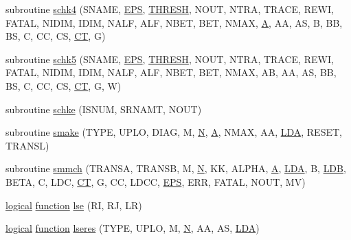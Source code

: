 \begin{DoxyCompactItemize}
\item 
subroutine \hyperlink{sblat3_8f_a57343063350f870a00e61c74d426e7d9}{schk4} (S\+N\+A\+M\+E, \hyperlink{tukey_8c_a6ebf6899d6c1c8b7b9d09be872c05aae}{E\+P\+S}, \hyperlink{zlaqgs_8c_a0656018abfc9fa2821827415f5d5ea57}{T\+H\+R\+E\+S\+H}, N\+O\+U\+T, N\+T\+R\+A, T\+R\+A\+C\+E, R\+E\+W\+I, F\+A\+T\+A\+L, N\+I\+D\+I\+M, I\+D\+I\+M, N\+A\+L\+F, A\+L\+F, N\+B\+E\+T, B\+E\+T, N\+M\+A\+X, \hyperlink{classA}{A}, A\+A, A\+S, B, B\+B, B\+S, C, C\+C, C\+S, \hyperlink{tau_8h_ae9ab3801c1afb4f20cfd669d76aec283}{C\+T}, G)
\item 
subroutine \hyperlink{sblat3_8f_a811bf0c7768bfc6cbd7ebe565f6f42a1}{schk5} (S\+N\+A\+M\+E, \hyperlink{tukey_8c_a6ebf6899d6c1c8b7b9d09be872c05aae}{E\+P\+S}, \hyperlink{zlaqgs_8c_a0656018abfc9fa2821827415f5d5ea57}{T\+H\+R\+E\+S\+H}, N\+O\+U\+T, N\+T\+R\+A, T\+R\+A\+C\+E, R\+E\+W\+I, F\+A\+T\+A\+L, N\+I\+D\+I\+M, I\+D\+I\+M, N\+A\+L\+F, A\+L\+F, N\+B\+E\+T, B\+E\+T, N\+M\+A\+X, A\+B, A\+A, A\+S, B\+B, B\+S, C, C\+C, C\+S, \hyperlink{tau_8h_ae9ab3801c1afb4f20cfd669d76aec283}{C\+T}, G, W)
\item 
subroutine \hyperlink{sblat3_8f_a1e23a9d74d4acf6f0a0c0944d653b213}{schke} (I\+S\+N\+U\+M, S\+R\+N\+A\+M\+T, N\+O\+U\+T)
\item 
subroutine \hyperlink{sblat3_8f_af6989f98e6d5db4084fdbf5b2a153d3d}{smake} (T\+Y\+P\+E, U\+P\+L\+O, D\+I\+A\+G, M, \hyperlink{polmisc_8c_a0240ac851181b84ac374872dc5434ee4}{N}, \hyperlink{classA}{A}, N\+M\+A\+X, A\+A, \hyperlink{example__user_8c_ae946da542ce0db94dced19b2ecefd1aa}{L\+D\+A}, R\+E\+S\+E\+T, T\+R\+A\+N\+S\+L)
\item 
subroutine \hyperlink{sblat3_8f_a8b530541d1d90ba10621058fbabcf4e4}{smmch} (T\+R\+A\+N\+S\+A, T\+R\+A\+N\+S\+B, M, \hyperlink{polmisc_8c_a0240ac851181b84ac374872dc5434ee4}{N}, K\+K, A\+L\+P\+H\+A, \hyperlink{classA}{A}, \hyperlink{example__user_8c_ae946da542ce0db94dced19b2ecefd1aa}{L\+D\+A}, B, \hyperlink{example__user_8c_a50e90a7104df172b5a89a06c47fcca04}{L\+D\+B}, B\+E\+T\+A, C, L\+D\+C, \hyperlink{tau_8h_ae9ab3801c1afb4f20cfd669d76aec283}{C\+T}, G, C\+C, L\+D\+C\+C, \hyperlink{tukey_8c_a6ebf6899d6c1c8b7b9d09be872c05aae}{E\+P\+S}, E\+R\+R, F\+A\+T\+A\+L, N\+O\+U\+T, M\+V)
\item 
\hyperlink{tnc_8c_aa7b64cdf39500931f7b333343791a104}{logical} \hyperlink{afunc_8m_a7b5e596df91eadea6c537c0825e894a7}{function} \hyperlink{sblat3_8f_a1c298334ebbca6a82c3c32bc24fa9286}{lse} (R\+I, R\+J, L\+R)
\item 
\hyperlink{tnc_8c_aa7b64cdf39500931f7b333343791a104}{logical} \hyperlink{afunc_8m_a7b5e596df91eadea6c537c0825e894a7}{function} \hyperlink{sblat3_8f_a338dd593080b76432c2540c9c4837ff9}{lseres} (T\+Y\+P\+E, U\+P\+L\+O, M, \hyperlink{polmisc_8c_a0240ac851181b84ac374872dc5434ee4}{N}, A\+A, A\+S, \hyperlink{example__user_8c_ae946da542ce0db94dced19b2ecefd1aa}{L\+D\+A})

\end{DoxyCompactItemize}
